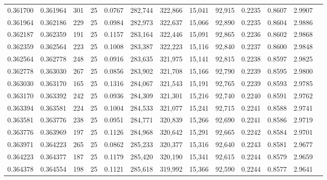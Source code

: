 \begin{tabular}{rrrrrrrrrrrrr}
0.361700 & 0.361964 &   301 &  25 &                                     0.0767 & 282,744 & 322,866 &  15,041 &  92,915 & 0.2235 & 0.8607 & 2.9907 \\
0.361964 & 0.362186 &   229 &  25 &                                     0.0984 & 282,973 & 322,637 &  15,066 &  92,890 & 0.2235 & 0.8604 & 2.9886 \\
0.362187 & 0.362359 &   191 &  25 &                                     0.1157 & 283,164 & 322,446 &  15,091 &  92,865 & 0.2236 & 0.8602 & 2.9868 \\
0.362359 & 0.362564 &   223 &  25 &                                     0.1008 & 283,387 & 322,223 &  15,116 &  92,840 & 0.2237 & 0.8600 & 2.9848 \\
0.362564 & 0.362778 &   248 &  25 &                                     0.0916 & 283,635 & 321,975 &  15,141 &  92,815 & 0.2238 & 0.8597 & 2.9825 \\
0.362778 & 0.363030 &   267 &  25 &                                     0.0856 & 283,902 & 321,708 &  15,166 &  92,790 & 0.2239 & 0.8595 & 2.9800 \\
0.363030 & 0.363170 &   165 &  25 &                                     0.1316 & 284,067 & 321,543 &  15,191 &  92,765 & 0.2239 & 0.8593 & 2.9785 \\
0.363170 & 0.363392 &   242 &  25 &                                     0.0936 & 284,309 & 321,301 &  15,216 &  92,740 & 0.2240 & 0.8591 & 2.9762 \\
0.363394 & 0.363581 &   224 &  25 &                                     0.1004 & 284,533 & 321,077 &  15,241 &  92,715 & 0.2241 & 0.8588 & 2.9741 \\
0.363581 & 0.363776 &   238 &  25 &                                     0.0951 & 284,771 & 320,839 &  15,266 &  92,690 & 0.2241 & 0.8586 & 2.9719 \\
0.363776 & 0.363969 &   197 &  25 &                                     0.1126 & 284,968 & 320,642 &  15,291 &  92,665 & 0.2242 & 0.8584 & 2.9701 \\
0.363971 & 0.364223 &   265 &  25 &                                     0.0862 & 285,233 & 320,377 &  15,316 &  92,640 & 0.2243 & 0.8581 & 2.9677 \\
0.364223 & 0.364377 &   187 &  25 &                                     0.1179 & 285,420 & 320,190 &  15,341 &  92,615 & 0.2244 & 0.8579 & 2.9659 \\
0.364378 & 0.364554 &   198 &  25 &                                     0.1121 & 285,618 & 319,992 &  15,366 &  92,590 & 0.2244 & 0.8577 & 2.9641 \\

\end{tabular}
